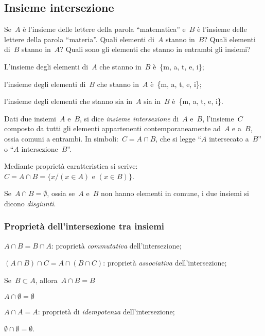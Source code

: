 
\subsection{Insieme intersezione}
\label{subsec:op_intersezione}

\begin{exrig}
\vspace{1.05ex}
 \begin{esempio}
Se~$A$ è l'insieme delle lettere della parola ``matematica'' e~$B$ è 
l'insieme delle lettere della parola ``materia''. 
Quali elementi di~$A$ stanno in~$B$? Quali elementi di~$B$ stanno in~$A$? 
Quali sono gli elementi che stanno in entrambi gli insiemi?

\begin{itemize*}
 \item L'insieme degli elementi di~$A$ che stanno in~$B$ è~\{m, a, t, e, i\};
 \item l'insieme degli elementi di~$B$ che stanno in~$A$ è~\{m, a, t, e, i\};
 \item l'insieme degli elementi che stanno sia in~$A$ sia in~$B$ 
 è~\{m, a, t, e, i\}.
\end{itemize*}
\end{esempio}
\end{exrig}

\begin{definizione}
Dati due insiemi~$A$ e~$B$, si dice \emph{insieme intersezione} di~$A$ e~$B$, 
l'insieme~$C$ composto da tutti gli elementi appartenenti contemporaneamente 
ad~$A$ e a~$B$, ossia comuni a entrambi.
In simboli:~$C=A\cap B$, che si legge ``$A$ intersecato a~$B$'' o ``$A$ 
intersezione~$B$''.
\end{definizione}
\begin{center}
 
\end{center}
Mediante proprietà caratteristica si 
scrive:~$C=A\cap B=\{x/(x\in A)\text{ e }(x\in B)\}$.

Se~$A\cap B=\emptyset $, ossia se~$A$ e~$B$ non hanno
elementi in comune, i due insiemi si dicono \emph{disgiunti}.

\subsubsection{Proprietà dell'intersezione tra insiemi}

\begin{enumeratea}
\item $A\cap B=B\cap A$: proprietà \emph{commutativa} dell'intersezione;
\item $(A\cap B)\cap C=A\cap (B\cap C)$: proprietà \emph{associativa} 
dell'intersezione;
\item Se~$B\subset A$, allora~$A\cap B=B$
\item $A\cap \emptyset =\emptyset$
\item $A\cap A=A$: proprietà di \emph{idempotenza} dell'intersezione;
\item $\emptyset \cap \emptyset =\emptyset$.
\end{enumeratea}

